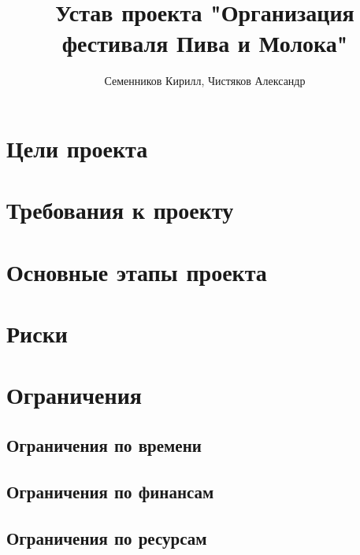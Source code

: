 \documentclass[a4paper,12pt]{article}
\author{Семенников Кирилл, Чистяков Александр}
\title{Устав проекта "Организация фестиваля Пива и Молока"}
\begin{document}
\maketitle
\section{Цели проекта}
\section{Требования к проекту}
\section{Основные этапы проекта}
\section{Риски}
\section{Ограничения}
\subsection{Ограничения по времени}
\subsection{Ограничения по финансам}
\subsection{Ограничения по ресурсам}
\end{document}
